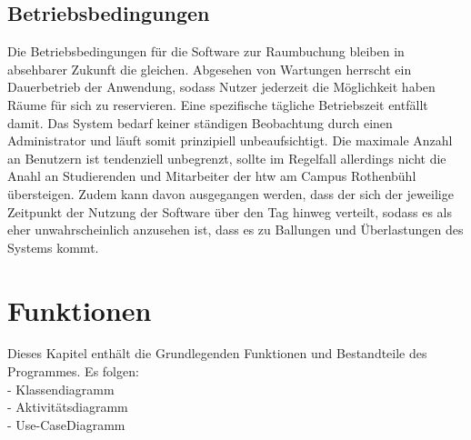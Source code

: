 \documentclass[a4paper,12pt]{article}
\begin{document}
\subsection{Betriebsbedingungen}
Die Betriebsbedingungen für die Software zur Raumbuchung bleiben in absehbarer Zukunft die gleichen. Abgesehen von Wartungen herrscht ein Dauerbetrieb der Anwendung, sodass Nutzer jederzeit die Möglichkeit haben Räume für sich zu reservieren. Eine spezifische tägliche Betriebszeit entfällt damit. Das System bedarf keiner ständigen Beobachtung durch einen Administrator und läuft somit prinzipiell unbeaufsichtigt. Die maximale Anzahl an Benutzern ist tendenziell unbegrenzt, sollte im Regelfall allerdings nicht die Anahl an Studierenden und Mitarbeiter der htw am Campus Rothenbühl übersteigen. Zudem kann davon ausgegangen werden, dass der sich der jeweilige Zeitpunkt der Nutzung der Software über den Tag hinweg verteilt, sodass es als eher unwahrscheinlich anzusehen ist, dass es zu Ballungen und Überlastungen des Systems kommt.
 
\newpage

\section{Funktionen}
Dieses Kapitel enthält die Grundlegenden Funktionen und Bestandteile des Programmes. Es folgen:\\
- Klassendiagramm\\
- Aktivitätsdiagramm\\
- Use-CaseDiagramm\\ 
\end{document}
